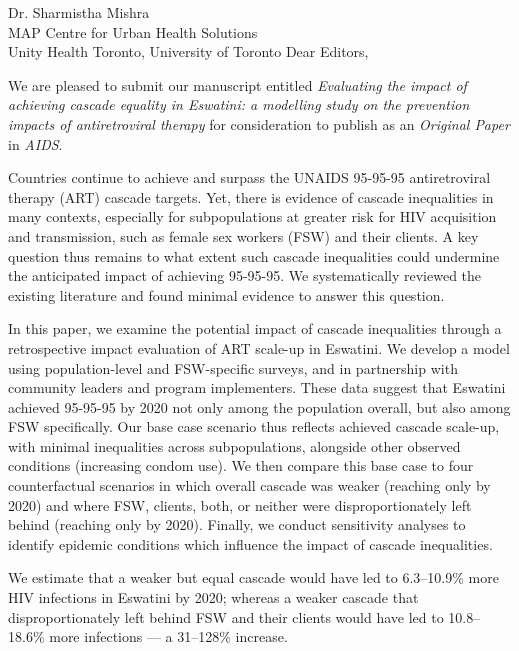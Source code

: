 \address{
  Dr. Michael S Saag\\
  Editor-in-Chief\\
  AIDS
}{Dr. Sharmistha Mishra\\
  MAP Centre for Urban Health Solutions\\
  Unity Health Toronto, University of Toronto}
Dear Editors,
\par
We are pleased to submit our manuscript entitled
\emph{Evaluating the impact of achieving cascade equality in Eswatini:
  a modelling study on the prevention impacts of antiretroviral therapy}
for consideration to publish as an \emph{Original Paper} in \emph{AIDS}.
\par
Countries continue to achieve and surpass
the UNAIDS 95-95-95 antiretroviral therapy (ART) cascade targets.
Yet, there is evidence of cascade inequalities in many contexts,
especially for subpopulations at greater risk for HIV acquisition and transmission,
such as female sex workers (FSW) and their clients.
A key question thus remains to what extent
such cascade inequalities could undermine the anticipated impact of achieving 95-95-95.
We systematically reviewed the existing literature
and found minimal evidence to answer this question.
\par
In this paper, we examine the potential impact of cascade inequalities
through a retrospective impact evaluation of ART scale-up in Eswatini.
We develop a model using population-level and FSW-specific surveys,
and in partnership with community leaders and program implementers.
These data suggest that Eswatini achieved 95-95-95 by 2020
not only among the population overall, but also among FSW specifically.
Our base case scenario thus reflects achieved cascade scale-up,
with minimal inequalities across subpopulations,
alongside other observed conditions (\eg increasing condom use).
We then compare this base case to four counterfactual scenarios in which
overall cascade was weaker (reaching only \casmd by 2020) and where
FSW, clients, both, or neither were disproportionately left behind
(reaching only \caslo by 2020).
Finally, we conduct sensitivity analyses to identify epidemic conditions
which influence the impact of cascade inequalities.
\par
We estimate that a weaker but equal cascade
would have led to 6.3--10.9\% more HIV infections in Eswatini by 2020;
whereas a weaker cascade that disproportionately left behind FSW and their clients
would have led to 10.8--18.6\% more infections
--- a 31--128\% increase.
